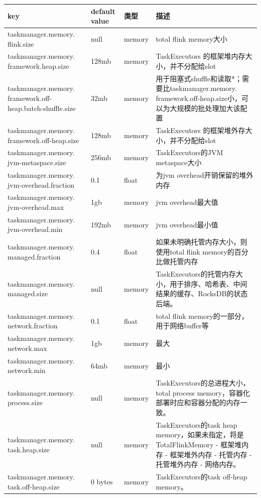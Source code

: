 \documentclass[UTF8]{ctexart}
\begin{document}
    \begin{minipage}[b]{1\linewidth}
        \begin{tabular}{|p{3.5cm}|l|l|p{6cm}|}
            \hline
            key&default value&类型&描述\\
            \hline
            taskmanager.memory. flink.size & null & memory & total flink memory大小\\
            \hline
            taskmanager.memory. framework.heap.size & 128mb & memory & TaskExecutors 的框架堆内存大小，并不分配给slot\\
            \hline
            taskmanager.memory. framework.off-heap.batch-shuffle.size & 32mb & memory & 用于阻塞式shuffle和读取*；需要比taskmanager.memory. framework.off-heap.size小，可以为大规模的批处理加大该配置\\
            \hline
            taskmanager.memory. framework.off-heap.size & 128mb & memory & TaskExecutors 的框架堆外存大小，并不分配给slot\\
            \hline
            taskmanager.memory. jvm-metaspace.size & 256mb & memory & TaskExecutors的JVM metaspace大小\\
            \hline
            taskmanager.memory. jvm-overhead.fraction & 0.1 & float & 为jvm overhead开销保留的堆外内存\\
            \hline
            taskmanager.memory. jvm-overhead.max & 1gb & memory & jvm overhead最大值\\
            \hline
            taskmanager.memory. jvm-overhead.min & 192mb & memory & jvm overhead最小值\\
            \hline
            taskmanager.memory. managed.fraction & 0.4 & float & 如果未明确托管内存大小，则使用total flink memory的百分比做托管内存\\
            \hline
            taskmanager.memory. managed.size & null & memory & TaskExecutors的托管内存大小，用于排序、哈希表、中间结果的缓存、RocksDB的状态后端。\\
            \hline
            taskmanager.memory. network.fraction & 0.1 & float & total flink memory的一部分，用于网络buffer等\\
            \hline
            taskmanager.memory. network.max & 1gb & memory & 最大\\
            \hline
            taskmanager.memory. network.min & 64mb & memory & 最小\\
            \hline
            taskmanager.memory. process.size & null & memory & TaskExecutors的总进程大小，total process memory，容器化部署时应和容器分配的内存一致。\\
            \hline
            taskmanager.memory. task.heap.size & null & memory & TaskExecutors的task heap memory，如果未指定，将是TotalFlinkMemory - 框架堆内存 - 框架堆外内存 - 托管内存 - 托管堆外内存 - 网络内存。\\
            \hline
            taskmanager.memory. task.off-heap.size & 0 bytes & memory & TaskExecutors的task off-heap memory。\\
            \hline    
        \end{tabular}
    \end{minipage}
\end{document}
